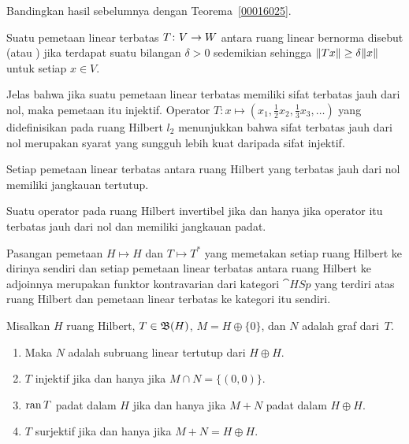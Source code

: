 Bandingkan hasil sebelumnya dengan Teorema~\ref{00016025}.

\begin{defn}\label{def_bdd_away_zero} Suatu pemetaan linear terbatas $T \colon V \rightarrow W$ antara ruang linear bernorma disebut
 (atau
) jika terdapat suatu bilangan $\delta > 0$ sedemikian sehingga $\lVert Tx\rVert \ge \delta\lVert x\rVert$ untuk setiap $x \in V$.
\end{defn}

\begin{exam} Jelas bahwa jika suatu pemetaan linear terbatas memiliki sifat terbatas jauh dari nol, maka pemetaan itu injektif. Operator
$T\colon x \mapsto (x_1, \frac12 x_2, \frac13 x_3, \dots)$ yang didefinisikan pada ruang Hilbert $l_2$ menunjukkan bahwa sifat terbatas
jauh dari nol merupakan syarat yang sungguh lebih kuat daripada sifat injektif.
\end{exam}

\begin{prop}\label{prop_bafz_closed_rng} Setiap pemetaan linear terbatas antara ruang Hilbert yang terbatas jauh dari
nol memiliki jangkauan tertutup.
\end{prop}

\begin{prop}\label{prop_nasc_op_invert} Suatu operator pada ruang Hilbert invertibel jika dan hanya jika
operator itu terbatas jauh dari nol dan memiliki jangkauan padat.
\end{prop}

\begin{prop} Pasangan pemetaan $H \mapsto H$ dan $T \mapsto T^*$ yang memetakan setiap ruang Hilbert ke
dirinya sendiri dan setiap pemetaan linear terbatas antara ruang Hilbert ke adjoinnya merupakan funktor kontravarian
dari kategori $\cat{HSp}$ yang terdiri atas ruang Hilbert dan pemetaan linear terbatas ke kategori itu sendiri.
\end{prop}

\begin{prop} Misalkan $H$ ruang Hilbert, $T \in \mathfrak{B}(H)$, $M = H \oplus \{0\}$, dan $N$ adalah graf dari~$T$.
 \begin{enumerate}[label=\rm{(\alph*)}]
  \item Maka $N$ adalah subruang linear tertutup dari $H \oplus H$.
  \item $T$ injektif jika dan hanya jika $M \cap N = \{(0,0)\}$.
  \item $\operatorname{ran} T$ padat dalam $H$ jika dan hanya jika $M + N$ padat dalam $H \oplus H$.
  \item $T$ surjektif jika dan hanya jika $M + N = H \oplus H$.
 \end{enumerate}
\end{prop}

